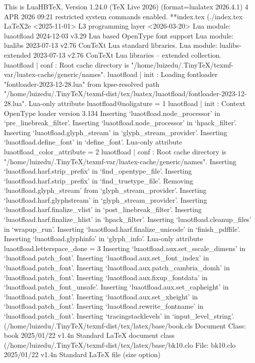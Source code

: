 This is LuaHBTeX, Version 1.24.0 (TeX Live 2026)  (format=lualatex 2026.4.1)  4 APR 2026 09:21
 restricted system commands enabled.
**index.tex
(./index.tex
LaTeX2e <2025-11-01>
L3 programming layer <2026-03-20>
Lua module: luaotfload 2024-12-03 v3.29 Lua based OpenType font support
Lua module: lualibs 2023-07-13 v2.76 ConTeXt Lua standard libraries.
Lua module: lualibs-extended 2023-07-13 v2.76 ConTeXt Lua libraries -- extended collection.
luaotfload | conf : Root cache directory is "/home/luizedu/.TinyTeX/texmf-var/luatex-cache/generic/names".
luaotfload | init : Loading fontloader "fontloader-2023-12-28.lua" from kpse-resolved path "/home/luizedu/.TinyTeX/texmf-dist/tex/luatex/luaotfload/fontloader-2023-12-28.lua".
Lua-only attribute luaotfload@noligature = 1
luaotfload | init : Context OpenType loader version 3.134
Inserting `luaotfload.node_processor' in `pre_linebreak_filter'.
Inserting `luaotfload.node_processor' in `hpack_filter'.
Inserting `luaotfload.glyph_stream' in `glyph_stream_provider'.
Inserting `luaotfload.define_font' in `define_font'.
Lua-only attribute luaotfload_color_attribute = 2
luaotfload | conf : Root cache directory is "/home/luizedu/.TinyTeX/texmf-var/luatex-cache/generic/names".
Inserting `luaotfload.harf.strip_prefix' in `find_opentype_file'.
Inserting `luaotfload.harf.strip_prefix' in `find_truetype_file'.
Removing  `luaotfload.glyph_stream' from `glyph_stream_provider'.
Inserting `luaotfload.harf.glyphstream' in `glyph_stream_provider'.
Inserting `luaotfload.harf.finalize_vlist' in `post_linebreak_filter'.
Inserting `luaotfload.harf.finalize_hlist' in `hpack_filter'.
Inserting `luaotfload.cleanup_files' in `wrapup_run'.
Inserting `luaotfload.harf.finalize_unicode' in `finish_pdffile'.
Inserting `luaotfload.glyphinfo' in `glyph_info'.
Lua-only attribute luaotfload.letterspace_done = 3
Inserting `luaotfload.aux.set_sscale_dimens' in `luaotfload.patch_font'.
Inserting `luaotfload.aux.set_font_index' in `luaotfload.patch_font'.
Inserting `luaotfload.aux.patch_cambria_domh' in `luaotfload.patch_font'.
Inserting `luaotfload.aux.fixup_fontdata' in `luaotfload.patch_font_unsafe'.
Inserting `luaotfload.aux.set_capheight' in `luaotfload.patch_font'.
Inserting `luaotfload.aux.set_xheight' in `luaotfload.patch_font'.
Inserting `luaotfload.rewrite_fontname' in `luaotfload.patch_font'.
Inserting `tracingstacklevels' in `input_level_string'. (/home/luizedu/.TinyTeX/texmf-dist/tex/latex/base/book.cls
Document Class: book 2025/01/22 v1.4n Standard LaTeX document class
(/home/luizedu/.TinyTeX/texmf-dist/tex/latex/base/bk10.clo
File: bk10.clo 2025/01/22 v1.4n Standard LaTeX file (size option)

